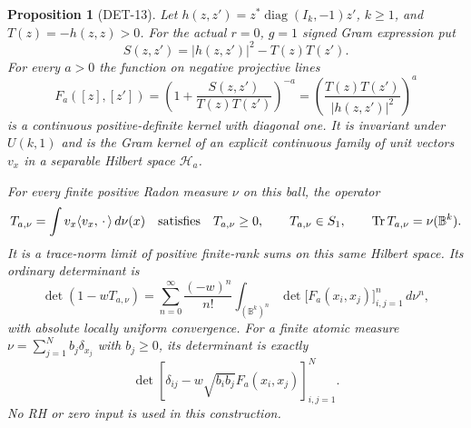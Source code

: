 \documentclass[11pt,a4paper]{article}
\newtheorem*{proposition}{Proposition}
\begin{document}
\begin{proposition}[DET-13]
Let $h(z,z')=z^*\operatorname{diag}(I_k,-1)z'$, $k\ge1$, and
$T(z)=-h(z,z)>0$.  For the actual $r=0$, $g=1$ signed Gram expression put
\[
 S(z,z')=|h(z,z')|^2-T(z)T(z').
\]
For every $a>0$ the function on negative projective lines
\begin{equation}
 F_a([z],[z'])=
 \left(1+\frac{S(z,z')}{T(z)T(z')}\right)^{-a}
 =\left(\frac{T(z)T(z')}{|h(z,z')|^2}\right)^a
 \label{eq:positive-gram-transform}
\end{equation}
is a continuous positive-definite kernel with diagonal one.  It is invariant
under $U(k,1)$ and is the Gram kernel of an explicit continuous family of unit
vectors $v_x$ in a separable Hilbert space $\mathcal H_a$.

For every finite positive Radon measure $\nu$ on this ball, the operator
\begin{equation}
 T_{a,\nu}=\int v_x\langle v_x,\,\cdot\,\rangle\,d\nu(x)
 \quad\hbox{satisfies}\quad
 T_{a,\nu}\ge0,\qquad T_{a,\nu}\in S_1,\qquad
 \operatorname{Tr}T_{a,\nu}=\nu(\mathbb B^k).
 \label{eq:positive-frame}
\end{equation}
It is a trace-norm limit of positive finite-rank sums on this same Hilbert
space.  Its ordinary determinant is
\begin{equation}
 \det(1-wT_{a,\nu})=
 \sum_{n=0}^{\infty}\frac{(-w)^n}{n!}
 \int_{(\mathbb B^k)^n}
 \det\big[F_a(x_i,x_j)\big]_{i,j=1}^n\,d\nu^n,
 \label{eq:positive-frame-det}
\end{equation}
with absolute locally uniform convergence.  For a finite atomic measure
$\nu=\sum_{j=1}^N b_j\delta_{x_j}$ with $b_j\ge0$, its determinant is exactly
\[
 \det\left[\delta_{ij}-w\sqrt{b_i b_j}F_a(x_i,x_j)\right]_{i,j=1}^N.
\]
No RH or zero input is used in this construction.
\end{proposition}
\end{document}
